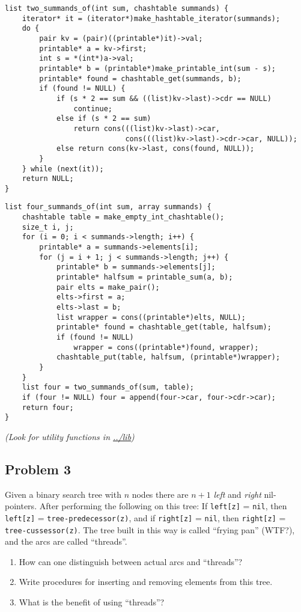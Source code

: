 \documentclass[11pt]{article}
\begin{document}
\lstset{language=C,label= ,caption= ,numbers=none}
\begin{lstlisting}
list two_summands_of(int sum, chashtable summands) {
    iterator* it = (iterator*)make_hashtable_iterator(summands);
    do {
        pair kv = (pair)((printable*)it)->val;
        printable* a = kv->first;
        int s = *(int*)a->val;
        printable* b = (printable*)make_printable_int(sum - s);
        printable* found = chashtable_get(summands, b);
        if (found != NULL) {
            if (s * 2 == sum && ((list)kv->last)->cdr == NULL)
                continue;
            else if (s * 2 == sum)
                return cons(((list)kv->last)->car,
                            cons(((list)kv->last)->cdr->car, NULL));
            else return cons(kv->last, cons(found, NULL));
        }
    } while (next(it));
    return NULL;
}
\end{lstlisting}

\lstset{language=C,label= ,caption= ,numbers=none}
\begin{lstlisting}
list four_summands_of(int sum, array summands) {
    chashtable table = make_empty_int_chashtable();
    size_t i, j;
    for (i = 0; i < summands->length; i++) {
        printable* a = summands->elements[i];
        for (j = i + 1; j < summands->length; j++) {
            printable* b = summands->elements[j];
            printable* halfsum = printable_sum(a, b);
            pair elts = make_pair();
            elts->first = a;
            elts->last = b;
            list wrapper = cons((printable*)elts, NULL);
            printable* found = chashtable_get(table, halfsum);
            if (found != NULL)
                wrapper = cons((printable*)found, wrapper);
            chashtable_put(table, halfsum, (printable*)wrapper);
        }
    }
    list four = two_summands_of(sum, table);
    if (four != NULL) four = append(four->car, four->cdr->car);
    return four;
}
\end{lstlisting}

\emph{(Look for utility functions in \url{../lib})}

\subsection{Problem 3}
\label{sec-1-3}
Given a binary search tree with $n$ nodes there are $n + 1$ \emph{left} and
\emph{right} nil-pointers.  After performing the following on this tree: If
\texttt{left[z]} = \texttt{nil}, then \texttt{left[z]} = \texttt{tree-predecessor(z)}, and if \texttt{right[z]}
= \texttt{nil}, then \texttt{right[z]} = \texttt{tree-cussessor(z)}.  The tree built in this way
is called ``frying pan'' (WTF?), and the arcs are called ``threads''.
\begin{enumerate}
\item How can one distinguish between actual arcs and ``threads''?
\item Write procedures for inserting and removing elements from this tree.
\item What is the benefit of using ``threads''?
\end{enumerate}
\end{document}
